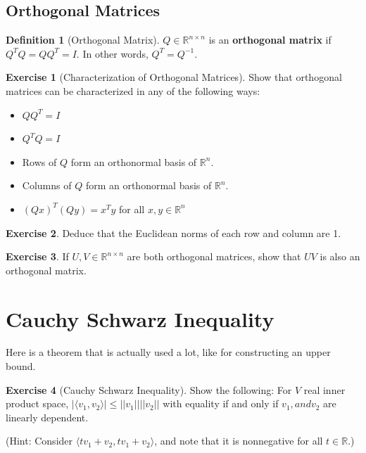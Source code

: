 \documentclass[12pt, a4paper]{article}
\newcommand{\R}{\mathbb{R}}
\newcommand{\inner}[1]{\langle #1 \rangle}
\newcommand{\norm}[1]{\lvert \lvert #1 \rvert \rvert}
\theoremstyle{remark}
\theoremstyle{definition}
\newtheorem{definition}{Definition}
\newtheorem{exercise}{Exercise}
\numberwithin{equation}{section}
\numberwithin{definition}{section}
\numberwithin{example}{section}
\numberwithin{exercise}{section}
\numberwithin{remark}{section}
\numberwithin{figure}{section}
\begin{document}
\subsection{Orthogonal Matrices}
\begin{definition}[Orthogonal Matrix]
    $Q \in \R^{n \times n}$ is an \textbf{orthogonal matrix} if $Q^T Q = Q Q^T = I$.
    In other words, $Q^T = Q^{-1}$.
\end{definition}
\begin{exercise}[Characterization of Orthogonal Matrices]
    Show that orthogonal matrices can be characterized in any of the following ways:
    \begin{itemize}
        \item $Q Q^T = I$
        \item $Q^T Q = I$
        \item Rows of $Q$ form an orthonormal basis of $\R^n$.
        \item Columns of $Q$ form an orthonormal basis of $\R^n$.
        \item $\left( Q x \right)^T \left( Q y \right) = x^T y$ for all $x, y \in \R^n$
    \end{itemize}
\end{exercise}
\begin{exercise}
    Deduce that the Euclidean norms of each row and column are 1.
\end{exercise}
\begin{exercise}
    If $U,V \in \R^{n \times n}$ are both orthogonal matrices, show that $UV$ is also an orthogonal matrix.
\end{exercise}

\section{Cauchy Schwarz Inequality}
Here is a theorem that is actually used a lot, like for constructing an upper bound.
\begin{exercise}[Cauchy Schwarz Inequality]
    Show the following:
    For $V$ real inner product space, $|\inner{v_1, v_2}| \leq \norm{v_1} \norm{v_2}$
    with equality if and only if $v_1, and v_2$ are linearly dependent.
    
    (Hint: Consider $\inner{tv_1 + v_2, tv_1 + v_2}$, and note that it is nonnegative for all $t \in \R$.)
\end{exercise}
\end{document}
